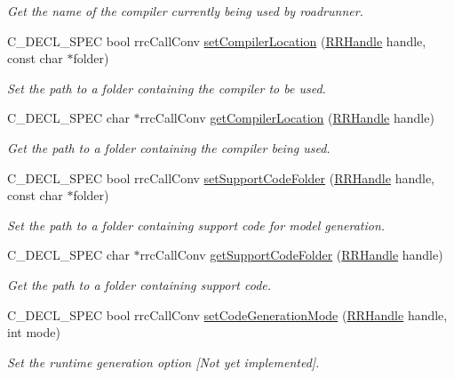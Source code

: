 \begin{DoxyCompactItemize}
\begin{DoxyCompactList}\small\item\em Get the name of the compiler currently being used by roadrunner. \end{DoxyCompactList}\item 
C\-\_\-\-D\-E\-C\-L\-\_\-\-S\-P\-E\-C bool rrc\-Call\-Conv \hyperlink{group__utility_gab910a88973c4f823b1f576c7767cc0d5}{set\-Compiler\-Location} (\hyperlink{rrc__types_8h_a1d68f0592372208fa5a5f2799ea4b3ae}{R\-R\-Handle} handle, const char $\ast$folder)
\begin{DoxyCompactList}\small\item\em Set the path to a folder containing the compiler to be used. \end{DoxyCompactList}\item 
C\-\_\-\-D\-E\-C\-L\-\_\-\-S\-P\-E\-C char $\ast$rrc\-Call\-Conv \hyperlink{group__utility_ga254939fcaf8c8ae7caaea2471fedc8b8}{get\-Compiler\-Location} (\hyperlink{rrc__types_8h_a1d68f0592372208fa5a5f2799ea4b3ae}{R\-R\-Handle} handle)
\begin{DoxyCompactList}\small\item\em Get the path to a folder containing the compiler being used. \end{DoxyCompactList}\item 
C\-\_\-\-D\-E\-C\-L\-\_\-\-S\-P\-E\-C bool rrc\-Call\-Conv \hyperlink{group__utility_ga0d8069e1538d2c41f243e3b6d56abf41}{set\-Support\-Code\-Folder} (\hyperlink{rrc__types_8h_a1d68f0592372208fa5a5f2799ea4b3ae}{R\-R\-Handle} handle, const char $\ast$folder)
\begin{DoxyCompactList}\small\item\em Set the path to a folder containing support code for model generation. \end{DoxyCompactList}\item 
C\-\_\-\-D\-E\-C\-L\-\_\-\-S\-P\-E\-C char $\ast$rrc\-Call\-Conv \hyperlink{group__utility_gad6fb8cb063c5cd3cae8cbdffc8a5f477}{get\-Support\-Code\-Folder} (\hyperlink{rrc__types_8h_a1d68f0592372208fa5a5f2799ea4b3ae}{R\-R\-Handle} handle)
\begin{DoxyCompactList}\small\item\em Get the path to a folder containing support code. \end{DoxyCompactList}\item 
C\-\_\-\-D\-E\-C\-L\-\_\-\-S\-P\-E\-C bool rrc\-Call\-Conv \hyperlink{group__utility_ga92ba42b5fab8b387744eedd03df10b60}{set\-Code\-Generation\-Mode} (\hyperlink{rrc__types_8h_a1d68f0592372208fa5a5f2799ea4b3ae}{R\-R\-Handle} handle, int mode)
\begin{DoxyCompactList}\small\item\em Set the runtime generation option \mbox{[}Not yet implemented\mbox{]}. \end{DoxyCompactList}\end{DoxyCompactItemize}


